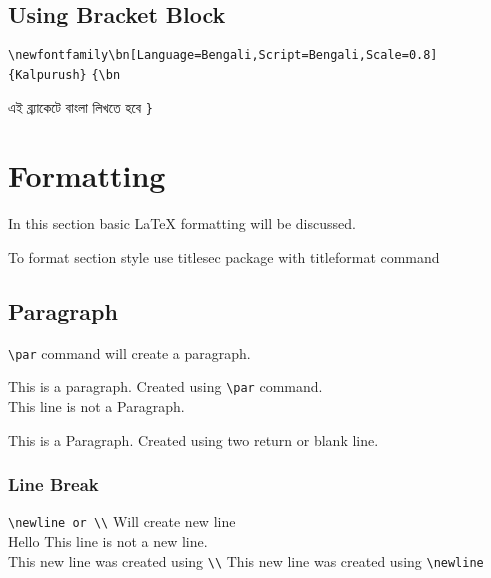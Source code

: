 \documentclass[10pt]{article}
\begin{document}
\subsection{Using Bracket Block}
\verb|\newfontfamily\bn[Language=Bengali,Script=Bengali,Scale=0.8]{Kalpurush}|
\verb|{\bn| {\bn এই ব্র্যাকেটে বাংলা লিখতে হবে \verb|}|

\section{Formatting\label{Formatting}}
In this section basic \LaTeX{} formatting will be discussed.

To format section style use titlesec
package with titleformat command \\

\subsection{Paragraph}

\verb|\par|
command will create a paragraph.\par
This is a paragraph. Created using
\verb|\par|
command.\\
    This line is not a Paragraph.

This is a Paragraph.
Created using two return or blank line.

\subsubsection{Line Break}
\verb|\newline or \\| Will create new line\\
Hello
This line is not a new line. \\
This new line was created
using \verb|\\| \newline
This new line was created
using \verb|\newline|

}
\end{document}
